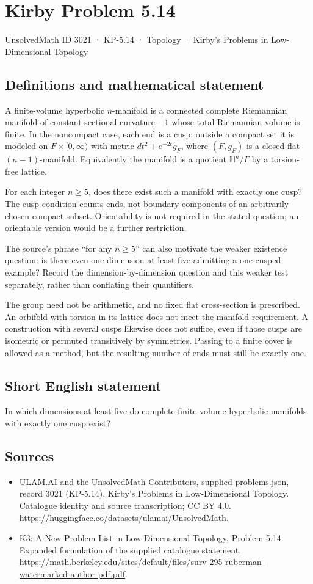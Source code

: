 \documentclass[11pt,a4paper]{article}
\begin{document}
\section*{Kirby Problem 5.14}\label{3021}
{\small UnsolvedMath ID 3021 · KP-5.14 · Topology · Kirby's Problems in Low-Dimensional Topology}
\subsection{Definitions and mathematical statement}
A finite-volume hyperbolic $n$-manifold is a connected complete Riemannian manifold of constant sectional curvature $-1$ whose total Riemannian volume is finite. In the noncompact case, each end is a cusp: outside a compact set it is modeled on $F\times[0,\infty)$ with metric $dt^2+e^{-2t}g_F$, where $(F,g_F)$ is a closed flat $(n-1)$-manifold. Equivalently the manifold is a quotient $\mathbb H^n/\Gamma$ by a torsion-free lattice.

For each integer $n\ge5$, does there exist such a manifold with exactly one cusp? The cusp condition counts ends, not boundary components of an arbitrarily chosen compact subset. Orientability is not required in the stated question; an orientable version would be a further restriction.

The source's phrase ``for any $n\ge5$'' can also motivate the weaker existence question: is there even one dimension at least five admitting a one-cusped example? Record the dimension-by-dimension question and this weaker test separately, rather than conflating their quantifiers.

The group need not be arithmetic, and no fixed flat cross-section is prescribed. An orbifold with torsion in its lattice does not meet the manifold requirement. A construction with several cusps likewise does not suffice, even if those cusps are isometric or permuted transitively by symmetries. Passing to a finite cover is allowed as a method, but the resulting number of ends must still be exactly one.
\subsection{Short English statement}
In which dimensions at least five do complete finite-volume hyperbolic manifolds with exactly one cusp exist?
\subsection{Sources}
\begin{itemize}
\item[S1] ULAM.AI and the UnsolvedMath Contributors, supplied problems.json, record 3021 (KP-5.14), Kirby's Problems in Low-Dimensional Topology. Catalogue identity and source transcription; CC BY 4.0.
\url{https://huggingface.co/datasets/ulamai/UnsolvedMath}.
\item[S2] K3: A New Problem List in Low-Dimensional Topology, Problem 5.14. Expanded formulation of the supplied catalogue statement.
\url{https://math.berkeley.edu/sites/default/files/surv-295-ruberman-watermarked-author-pdf.pdf}.
\end{itemize}
\end{document}
